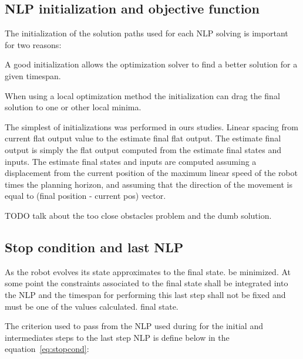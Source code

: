 \documentclass[eprint]{actapoly}
\begin{document}
\subsection{NLP initialization and objective function}


The initialization of the solution paths used for each NLP solving is important 
for two reasons:
\begin{itmeze}
 \item
A good initialization allows the
optimization solver to find a better solution for a given timespan.
 \item
When using a local optimization method the initialization
can drag the final solution to one or other local minima.
\end{itmeze}

The simplest of initializations was performed in ours studies. Linear spacing 
from current flat output value to the estimate final flat output.
The estimate final output is simply the flat output computed from the estimate 
final states and inputs. The estimate final states and inputs
are computed assuming a displacement from the current position of the maximum 
linear speed
of the robot times the planning horizon, and assuming that the direction of the 
movement is equal to (final position - current pos) vector.

TODO talk about the too close obstacles problem and the dumb solution.

\subsection{Stop condition and last NLP}


As the robot evolves its state approximates to the final state. 
be minimized.
At some point the constraints associated to the final state shall be integrated 
into the NLP and the timespan for performing this last
step shall not be fixed and must be one of the values calculated.
final state.

The criterion used to pass from the NLP used during for the initial and 
intermediates steps to the last step NLP 
is define below in the equation~\ref{eq:stopcond}:
\end{document}
